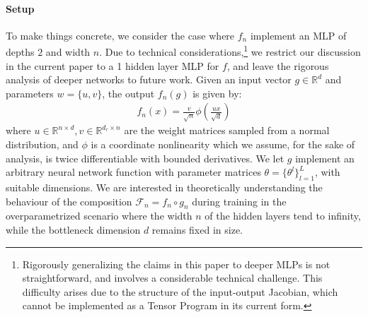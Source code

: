 \documentclass{article}
\theoremstyle{definition}
\theoremstyle{remark}
\renewcommand{\[}{\begin{eqnarray}}
\renewcommand{\]}{\end{eqnarray}}
\renewcommand{\[}{\begin{eqnarray}}
\renewcommand{\]}{\end{eqnarray}}
\newcommand{\R}{\mathbb{R}}
\newcommand{\F}{\mathcal{F}}
\begin{document}
\paragraph{Setup}
\label{par:setup}
To make things concrete, we consider the case where $f_n$ implement an MLP of depths $2$ and width $n$. Due to technical considerations,\footnote{Rigorously generalizing the claims in this paper to deeper MLPs is not straightforward, and involves a considerable technical challenge. This difficulty arises due to the structure of the input-output Jacobian, which cannot be implemented as a Tensor Program \cite{yang,yang2,yang3} in its current form.} we restrict our discussion in the current paper to a 1 hidden layer MLP for $f$, and leave the rigorous analysis of deeper networks to future work. Given an input vector $g \in \R^d$ and parameters $w = \{u,v\}$, the output $f_n(g)$ is given by:
\begin{align}\label{eqn:mlp}
    f_n(x) = \frac{v}{\sqrt{n}}\phi(\frac{ux}{\sqrt{d}})
\end{align}
where $u \in \R^{n \times d},v \in \R^{d_r \times n}$ are the weight matrices sampled from a normal distribution, and
$\phi$ is a coordinate nonlinearity which we assume, for the sake of analysis, is twice differentiable with bounded derivatives. We let $g$ implement an arbitrary neural network function with parameter matrices $\theta = \{\theta^l\}_{l=1}^{L}$, with suitable dimensions. 
We are interested in theoretically understanding the behaviour of the composition $\F_n = f_n \circ g_n$ during training in the overparametrized scenario where the width $n$ of the hidden layers tend to infinity, while the bottleneck dimension $d$ remains fixed in size. 
\end{document}
